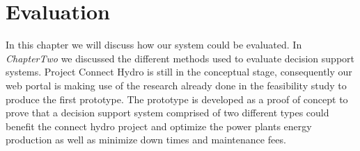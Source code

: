 \chapter{Evaluation}
\label{ChapterSix}
In this chapter we will discuss how our system could be evaluated. In \textit{ChapterTwo} we discussed the different methods used to evaluate decision support systems. Project Connect Hydro is still in the conceptual stage, consequently our web portal is making use of the research already done in the feasibility study to produce the first prototype. The prototype is developed as a proof of concept to prove that a decision support system comprised of two different types could benefit the connect hydro project and optimize the power plants energy production as well as minimize down times and maintenance fees.

